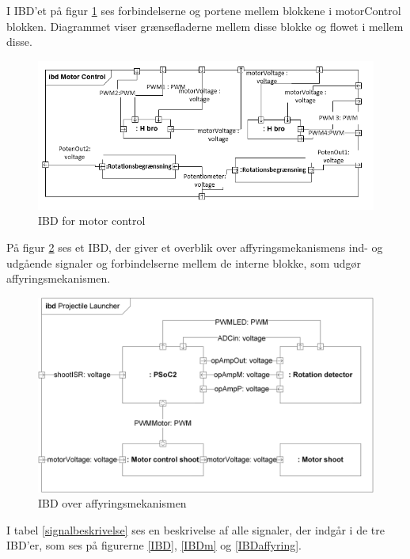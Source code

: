 I IBD'et på figur \ref{fig:IBDm} ses forbindelserne og portene mellem blokkene i motorControl blokken. Diagrammet viser grænsefladerne mellem disse blokke og flowet i mellem disse.

\begin{figure}[H]
	\centering
	\includegraphics[width= \textwidth]{Systemarkitektur/images/IBDmotorcontrol2}
	\caption{IBD for motor control}
	\label{fig:IBDm}
\end{figure}

På figur \ref{fig:IBDaffyring} ses et IBD, der giver et overblik over affyringsmekanismens ind- og udgående signaler og forbindelserne mellem de interne blokke, som udgør affyringsmekanismen. 

\begin{figure}[H]
	\centering
	\includegraphics[width= \textwidth]{Systemarkitektur/images/IBDaffyring}
	\caption{IBD over affyringsmekanismen}
	\label{fig:IBDaffyring}
\end{figure}

I tabel \ref{signalbeskrivelse} ses en beskrivelse af alle signaler, der indgår i de tre IBD'er, som ses på figurerne \ref{IBD}, \ref{IBDm} og \ref{IBDaffyring}. 

